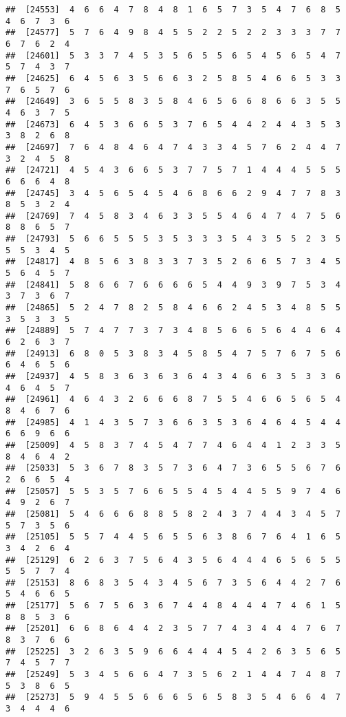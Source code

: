 \documentclass[
]{book}
\begin{document}
\begin{verbatim}
##  [24553]  4  6  6  4  7  8  4  8  1  6  5  7  3  5  4  7  6  8  5  4  6  7  3  6
##  [24577]  5  7  6  4  9  8  4  5  5  2  2  5  2  2  3  3  3  7  7  6  7  6  2  4
##  [24601]  5  3  3  7  4  5  3  5  6  5  5  6  5  4  5  6  5  4  7  5  7  4  3  7
##  [24625]  6  4  5  6  3  5  6  6  3  2  5  8  5  4  6  6  5  3  3  7  6  5  7  6
##  [24649]  3  6  5  5  8  3  5  8  4  6  5  6  6  8  6  6  3  5  5  4  6  3  7  5
##  [24673]  6  4  5  3  6  6  5  3  7  6  5  4  4  2  4  4  3  5  3  3  8  2  6  8
##  [24697]  7  6  4  8  4  6  4  7  4  3  3  4  5  7  6  2  4  4  7  3  2  4  5  8
##  [24721]  4  5  4  3  6  6  5  3  7  7  5  7  1  4  4  4  5  5  5  6  6  6  4  8
##  [24745]  3  4  5  6  5  4  5  4  6  8  6  6  2  9  4  7  7  8  3  8  5  3  2  4
##  [24769]  7  4  5  8  3  4  6  3  3  5  5  4  6  4  7  4  7  5  6  8  8  6  5  7
##  [24793]  5  6  6  5  5  5  3  5  3  3  3  5  4  3  5  5  2  3  5  5  5  3  4  5
##  [24817]  4  8  5  6  3  8  3  3  7  3  5  2  6  6  5  7  3  4  5  5  6  4  5  7
##  [24841]  5  8  6  6  7  6  6  6  6  5  4  4  9  3  9  7  5  3  4  3  7  3  6  7
##  [24865]  5  2  4  7  8  2  5  8  4  6  6  2  4  5  3  4  8  5  5  3  5  3  3  5
##  [24889]  5  7  4  7  7  3  7  3  4  8  5  6  6  5  6  4  4  6  4  6  2  6  3  7
##  [24913]  6  8  0  5  3  8  3  4  5  8  5  4  7  5  7  6  7  5  6  6  4  6  5  6
##  [24937]  4  5  8  3  6  3  6  3  6  4  3  4  6  6  3  5  3  3  6  4  6  4  5  7
##  [24961]  4  6  4  3  2  6  6  6  8  7  5  5  4  6  6  5  6  5  4  8  4  6  7  6
##  [24985]  4  1  4  3  5  7  3  6  6  3  5  3  6  4  6  4  5  4  4  6  6  9  6  6
##  [25009]  4  5  8  3  7  4  5  4  7  7  4  6  4  4  1  2  3  3  5  8  4  6  4  2
##  [25033]  5  3  6  7  8  3  5  7  3  6  4  7  3  6  5  5  6  7  6  2  6  6  5  4
##  [25057]  5  5  3  5  7  6  6  5  5  4  5  4  4  5  5  9  7  4  6  4  9  2  6  7
##  [25081]  5  4  6  6  6  8  8  5  8  2  4  3  7  4  4  3  4  5  7  5  7  3  5  6
##  [25105]  5  5  7  4  4  5  6  5  5  6  3  8  6  7  6  4  1  6  5  3  4  2  6  4
##  [25129]  6  2  6  3  7  5  6  4  3  5  6  4  4  4  6  5  6  5  5  5  5  7  7  4
##  [25153]  8  6  8  3  5  4  3  4  5  6  7  3  5  6  4  4  2  7  6  5  4  6  6  5
##  [25177]  5  6  7  5  6  3  6  7  4  4  8  4  4  4  7  4  6  1  5  8  8  5  3  6
##  [25201]  6  6  8  6  4  4  2  3  5  7  7  4  3  4  4  4  7  6  7  8  3  7  6  6
##  [25225]  3  2  6  3  5  9  6  6  4  4  4  5  4  2  6  3  5  6  5  7  4  5  7  7
##  [25249]  5  3  4  5  6  6  4  7  3  5  6  2  1  4  4  7  4  8  7  5  3  8  6  5
##  [25273]  5  9  4  5  5  6  6  6  5  6  5  8  3  5  4  6  6  4  7  3  4  4  4  6

\end{verbatim}
\end{document}
